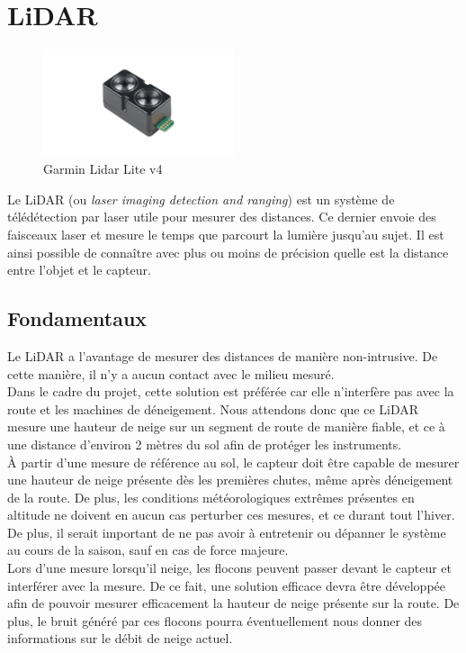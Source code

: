 \section{LiDAR}

\begin{figure}[H]
    \centering
    \includegraphics[width=0.5\textwidth]{Images/LiDAR/GarminLiDARLiteV4.jpg}
    \caption{Garmin Lidar Lite v4}
    \label{LiDARLiteV4}
\end{figure}

Le LiDAR (ou \emph{laser imaging detection and ranging}) est un système de télédétection par laser
utile pour mesurer des distances. Ce dernier envoie des faisceaux laser et mesure le temps que 
parcourt la lumière jusqu'au sujet. Il est ainsi possible de connaître avec plus ou moins de précision
quelle est la distance entre l'objet et le capteur.

\subsection{Fondamentaux}
Le LiDAR a l'avantage de mesurer des distances de manière non-intrusive. De cette manière, il n'y a 
aucun contact avec le milieu mesuré.\\
Dans le cadre du projet, cette solution est préférée car elle n'interfère pas avec la route et les 
machines de déneigement. Nous attendons donc que ce LiDAR mesure une hauteur de neige sur un 
segment de route de manière fiable, et ce à une distance d'environ 2 mètres du sol afin de protéger 
les instruments.\\
À partir d'une mesure de référence au sol, le capteur doit être capable de mesurer une hauteur de neige
présente dès les premières chutes, même après déneigement de la route. De plus, les conditions
météorologiques extrêmes présentes en altitude ne doivent en aucun cas perturber ces mesures, et ce
durant tout l'hiver. De plus, il serait important de ne pas avoir à entretenir ou dépanner le système
au cours de la saison, sauf en cas de force majeure.\\
Lors d'une mesure lorsqu'il neige, les flocons peuvent passer devant le capteur et interférer avec la
mesure. De ce fait, une solution efficace devra être développée afin de pouvoir mesurer efficacement
la hauteur de neige présente sur la route. De plus, le bruit généré par ces flocons pourra éventuellement
nous donner des informations sur le débit de neige actuel.

